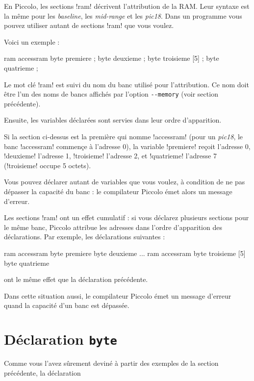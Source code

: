 En Piccolo, les sections \pic!ram! décrivent l'attribution de la RAM. Leur syntaxe est la même pour les \emph{baseline}, les \emph{mid-range} et les \emph{pic18}. Dans un programme vous pouvez utiliser autant de sections \pic!ram! que vous voulez.

Voici un exemple :

\begin{piccolo}
ram accessram {
  byte premiere ;
  byte deuxieme ;
  byte troisieme [5] ;
  byte quatrieme ;
}
\end{piccolo}

Le mot clé \pic!ram! est suivi du nom du banc utilisé pour l'attribution. Ce nom doit être l'un des noms de bancs affichés par l'option \texttt{-{}-memory} (voir section précédente).

Ensuite, les variables déclarées sont servies dans leur ordre d'apparition.

Si la section ci-dessus est la première qui nomme \pic!accessram! (pour un \emph{pic18}, le banc \pic!accessram! commençe à l'adresse 0), la variable \pic!premiere! reçoit l'adresse 0, \pic!deuxieme! l'adresse 1, \pic!troisieme! l'adresse 2, et \pic!quatrieme! l'adresse 7 (\pic!troisieme! occupe 5 octets).

Vous pouvez déclarer autant de variables que vous voulez, à condition de ne pas dépasser la capacité du banc : le compilateur Piccolo émet alors un message d'erreur.

Les sections \pic!ram! ont un effet cumulatif : si vous déclarez plusieurs sections pour le même banc, Piccolo attribue les adresses dans l'ordre d'apparition des déclarations. Par exemple, les déclarations suivantes :

\begin{piccolo}
ram accessram {
  byte premiere
  byte deuxieme
}
...
ram accessram {
  byte troisieme [5]
  byte quatrieme
}
\end{piccolo}

ont le même effet que la déclaration précédente.

Dans cette situation aussi, le compilateur Piccolo émet un message d'erreur quand la capacité d'un banc est dépassée. 



\section{Déclaration \texttt{byte}}

Comme vous l'avez sûrement deviné à partir des exemples de la section précédente, la déclaration

